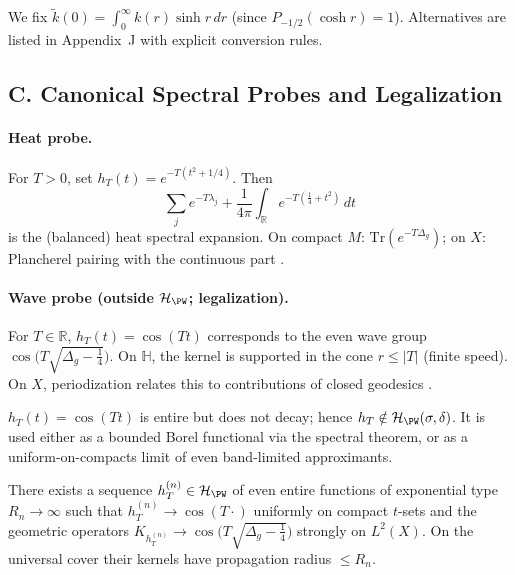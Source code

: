 \begin{remark}[Normalization at $t=0$]
\label{rem:t0}
We fix $\widetilde k(0)=\int_0^\infty k(r)\sinh r\,dr$ (since $P_{-1/2}(\cosh r)=1$). Alternatives are listed in Appendix~J with explicit conversion rules.
\end{remark}


\subsection*{C. Canonical Spectral Probes and Legalization}
\label{subsec:canonical-probes-sharp-patched}

\paragraph{Heat probe.}
For $T>0$, set $h_T(t)=e^{-T(t^2+1/4)}$. Then
\[
  \sum_j e^{-T\lambda_j}+\frac{1}{4\pi}\int_{\mathbb R} e^{-T(\tfrac14+t^2)}\,dt
\]
is the (balanced) heat spectral expansion. On compact $M$: $\mathrm{Tr}(e^{-T\Delta_g})$; on $X$: Plancherel pairing with the continuous part \cite{Minakshisundaram1949,Seeley1967}.

\paragraph{Wave probe (outside $\mathcal H_{\PW}$; legalization).}
For $T\in\mathbb R$, $h_T(t)=\cos(Tt)$ corresponds to the even wave group $\cos\!\big(T\sqrt{\Delta_g-\tfrac14}\big)$. On $\mathbb H$, the kernel is supported in the cone $r\le |T|$ (finite speed). On $X$, periodization relates this to contributions of closed geodesics \cite{Selberg1956,Hejhal1983}.

\begin{remark}
\label{rem:wave-outside}
$h_T(t)=\cos(Tt)$ is entire but does not decay; hence $h_T\notin\mathcal H_{\PW}(\sigma,\delta)$. It is used either as a bounded Borel functional via the spectral theorem, or as a uniform-on-compacts limit of even band-limited approximants.
\end{remark}

\begin{lemma}
\label{lem:wave-approx}
There exists a sequence $h_T^{(n)}\in\mathcal H_{\PW}$ of even entire functions of exponential type $R_n\to\infty$ such that $h_T^{(n)}\to \cos(T\cdot)$ uniformly on compact $t$-sets and the geometric operators $K_{h_T^{(n)}}\to \cos\!\big(T\sqrt{\Delta_g-\tfrac14}\big)$ strongly on $L^2(X)$. On the universal cover their kernels have propagation radius $\le R_n$.
\end{lemma}

